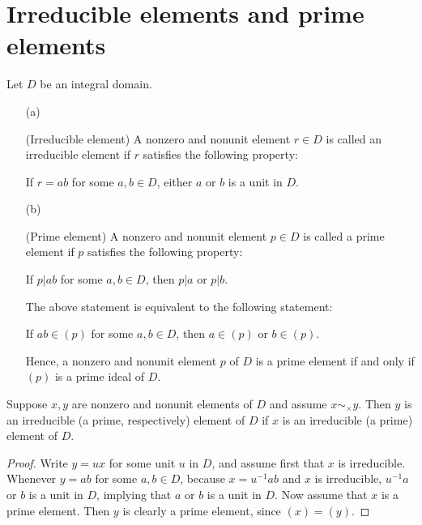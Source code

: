 \section{Irreducible elements and prime elements}

\begin{defi}
    Let $D$ be an integral domain.
    \begin{enumerate}
        \item[(a)]
        {
            (Irreducible element)
            A nonzero and nonunit element $r\in D$ is called an irreducible element if $r$ satisfies the following property:
            \begin{center}
                If $r=ab$ for some $a, b\in D$, either $a$ or $b$ is a unit in $D$.
            \end{center}
        }
        \item[(b)]
        {
            (Prime element)
            A nonzero and nonunit element $p\in D$ is called a prime element if $p$ satisfies the following property:
            \begin{center}
                If $p|ab$ for some $a, b\in D$, then $p|a$ or $p|b$.
            \end{center}
            The above statement is equivalent to the following statement:
            \begin{center}
                If $ab\in (p)$ for some $a, b\in D$, then $a\in (p)$ or $b\in (p)$.
            \end{center}
            Hence, a nonzero and nonunit element $p$ of $D$ is a prime element if and only if $(p)$ is a prime ideal of $D$.
        }
    \end{enumerate}
\end{defi}

\begin{obs}
    Suppose $x, y$ are nonzero and nonunit elements of $D$ and assume $x\sim_\times y$.
    Then $y$ is an irreducible (a prime, respectively) element of $D$ if $x$ is an irreducible (a prime) element of $D$.
\end{obs}
\begin{proof}
    Write $y=ux$ for some unit $u$ in $D$, and assume first that $x$ is irreducible.
    Whenever $y=ab$ for some $a, b\in D$, because $x=u^{-1}ab$ and $x$ is irreducible, $u^{-1}a$ or $b$ is a unit in $D$, implying that $a$ or $b$ is a unit in $D$.
    Now assume that $x$ is a prime element.
    Then $y$ is clearly a prime element, since $(x)=(y)$.
\end{proof}

